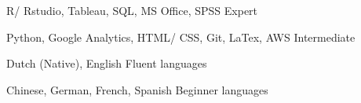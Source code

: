 
\begin{cventries}

\cventry
    {R/ Rstudio, Tableau, SQL, MS Office, SPSS} %
    {Expert} %
    {} %
    {} %
    {}

\cventry
    {Python, Google Analytics, HTML/ CSS, Git, LaTex, AWS} %
    {Intermediate} %
    {} %
    {} %
    {}

\cventry
    {Dutch (Native), English} %
    {Fluent languages} %
    {} %
    {} %
    {}

\cventry
    {Chinese, German, French, Spanish} %
    {Beginner languages} %
    {} %
    {} %
    {}



\end{cventries}